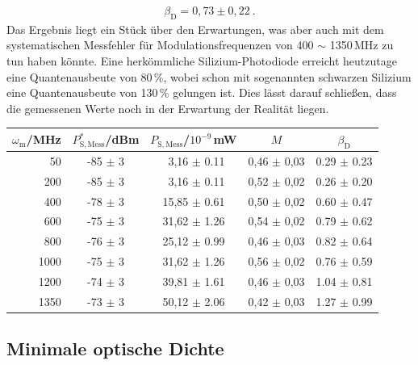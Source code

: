 \begin{gather}
    \boxed{\beta_\mathrm{D} = 0,73 \pm 0,22}~.
\end{gather}
Das Ergebnis liegt ein Stück über den Erwartungen, was aber auch mit dem systematischen Messfehler für Modulationsfrequenzen von 400 $\sim$ 1350\,MHz zu tun haben könnte.
Eine herkömmliche Silizium-Photodiode erreicht heutzutage eine Quantenausbeute von 80\,\%, wobei schon mit sogenannten schwarzen Silizium eine Quantenausbeute von 130\,\% gelungen ist. \cite{siPD} Dies lässt darauf schließen, dass die gemessenen Werte noch in der Erwartung der Realität liegen.
\begin{center}
    \captionsetup{type=table}
    \begin{tabular}{r | c c | c c}
        $\omega_\mathrm{m}$/MHz & $P^*_\mathrm{S,Mess}$/dBm & $P_\mathrm{S,Mess}$/$10^{-9}$\,mW & $M$ & $\beta_\mathrm{D}$\\ \hline
        50   & -85 $\pm$ 3 & ~3,16 $\pm$ 0.11 & 0,46 $\pm$ 0,03 & 0.29 $\pm$ 0.23 \\
        200  & -85 $\pm$ 3 & ~3,16 $\pm$ 0.11 & 0,52 $\pm$ 0,02 & 0.26 $\pm$ 0.20 \\
        400  & -78 $\pm$ 3 & 15,85 $\pm$ 0.61 & 0,50 $\pm$ 0,02 & 0.60 $\pm$ 0.47 \\
        600  & -75 $\pm$ 3 & 31,62 $\pm$ 1.26 & 0,54 $\pm$ 0,02 & 0.79 $\pm$ 0.62 \\
        800  & -76 $\pm$ 3 & 25,12 $\pm$ 0.99 & 0,46 $\pm$ 0,03 & 0.82 $\pm$ 0.64 \\
        1000 & -75 $\pm$ 3 & 31,62 $\pm$ 1.26 & 0,56 $\pm$ 0,02 & 0.76 $\pm$ 0.59 \\
        1200 & -74 $\pm$ 3 & 39,81 $\pm$ 1.61 & 0,46 $\pm$ 0,03 & 1.04 $\pm$ 0.81 \\
        1350 & -73 $\pm$ 3 & 50,12 $\pm$ 2.06 & 0,42 $\pm$ 0,03 & 1.27 $\pm$ 0.99 \\
    \end{tabular}
    \label{tab:ausbeute}
\end{center}

\subsection{Minimale optische Dichte}
\label{sub:minopDichte}

